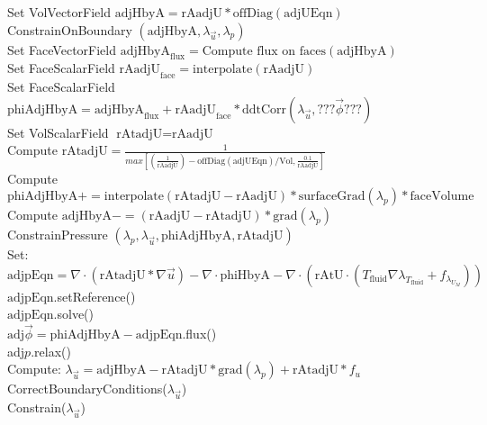 \documentclass[10pt]{article} %
\begin{document}
\begin{center}
\begin{algorithm}[H]
{{{				Set VolVectorField $\text{adjHbyA} =  \text{rAadjU}*\text{offDiag}(\text{adjUEqn})$\\
				ConstrainOnBoundary $(\text{adjHbyA},\lambda_{\vec{u}},\lambda_p)$\\
				\quad Set FaceVectorField $\text{adjHbyA}_{\text{flux}} =  \text{Compute flux on faces}(\text{adjHbyA})$\\
				\quad Set FaceScalarField $\text{rAadjU}_{\text{face}} =  \text{interpolate}(\text{rAadjU})$\\
				Set FaceScalarField $\text{phiAdjHbyA} = \text{adjHbyA}_{\text{flux}} + \text{rAadjU}_{\text{face}}*\text{ddtCorr}(\lambda_{\vec{u}}, ???\vec{\phi}??? ) $\\
				Set VolScalarField $\text{rAtadjU} = \text{rAadjU}$\\
				{
					Compute $\text{rAtadjU} =  \frac{1}{max\left[(\frac{1}{\text{rAadjU}}) - \text{offDiag}(\text{adjUEqn})/\text{Vol} , \frac{0.1}{\text{rAadjU}}\right]} $\\
					Compute $\text{phiAdjHbyA} += \text{interpolate}(\text{rAtadjU}-\text{rAadjU})*\text{surfaceGrad}(\lambda_p)*\text{faceVolume}$\\
					Compute $\text{adjHbyA} -=  \left(\text{rAadjU}-\text{rAtadjU}\right)*\text{grad}(\lambda_p)$\\
				}
				ConstrainPressure $(\lambda_p,\lambda_{\vec{u}},\text{phiAdjHbyA},\text{rAtadjU})$\\
				{
					Set: $\text{adjpEqn} = \nabla \cdot \left(\text{rAtadjU} * \nabla \vec{u}\right)-\nabla \cdot \text{phiHbyA} - \nabla \cdot \left(\text{rAtU} \cdot \left( T_{\text{fluid}} \nabla \lambda_{T_{\text{fluid}}} + f_{\lambda_{U_M}} \right)\right)$\\
					$\text{adjpEqn}.$setReference()\\
					$\text{adjpEqn}.$solve()\\
				}
				{
					$\text{adj}\vec{\phi} = \text{phiAdjHbyA} - \text{adjpEqn}$.flux()\\
				}
				adj$p.$relax()\\
				Compute: $\lambda_{\vec{u}} = \text{adjHbyA} - \text{rAtadjU}*\text{grad}(\lambda_p) + \text{rAtadjU}*f_u$\\
				CorrectBoundaryConditions($\lambda_{\vec{u}}$)\\
				Constrain($\lambda_{\vec{u}}$)
			}
			\quad \\
			{
}}}
\end{algorithm}
\end{center}
\end{document}
